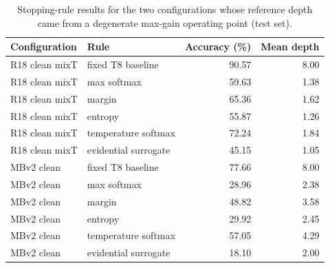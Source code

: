 \begin{table}[htbp]
\centering
\caption[Stopping rules at degenerate reference depths]{Stopping-rule results for the two configurations whose reference depth came from a degenerate max-gain operating point (test set).}
\label{tab:app-stoprules-degenerate}
\footnotesize
\begin{tabular}{@{}l l r r@{}}
\toprule
Configuration & Rule & Accuracy (\%) & Mean depth \\
\midrule
R18 clean mixT & fixed T8 baseline & 90.57 & 8.00 \\
R18 clean mixT & max softmax & 59.63 & 1.38 \\
R18 clean mixT & margin & 65.36 & 1.62 \\
R18 clean mixT & entropy & 55.87 & 1.26 \\
R18 clean mixT & temperature softmax & 72.24 & 1.84 \\
R18 clean mixT & evidential surrogate & 45.15 & 1.05 \\
\addlinespace
MBv2 clean & fixed T8 baseline & 77.66 & 8.00 \\
MBv2 clean & max softmax & 28.96 & 2.38 \\
MBv2 clean & margin & 48.82 & 3.58 \\
MBv2 clean & entropy & 29.92 & 2.45 \\
MBv2 clean & temperature softmax & 57.05 & 4.29 \\
MBv2 clean & evidential surrogate & 18.10 & 2.00 \\
\bottomrule
\end{tabular}
\end{table}

